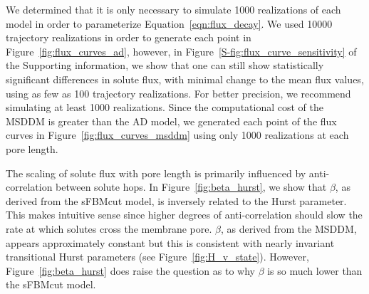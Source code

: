 \documentclass[12pt]{article}
\begin{document}
  

  We determined that it is only necessary to simulate 1000 realizations of each model
  in order to parameterize Equation~\ref{eqn:flux_decay}. We used 10000 trajectory
  realizations in order to generate each point in Figure~\ref{fig:flux_curves_ad}, 
  however, in Figure~\ref{S-fig:flux_curve_sensitivity} of the Supporting information,
  we show that one can still show statistically significant differences in solute 
  flux, with minimal change to the mean flux values, using as few as 100 trajectory
  realizations. 
  For better precision, we recommend simulating at least 1000 realizations. 
  Since the computational cost of the MSDDM is greater than the AD model, we generated
  each point of the flux curves in Figure~\ref{fig:flux_curves_msddm} using only 1000
  realizations at each pore length. 
  
  The scaling of solute flux with pore length is primarily influenced by anti-correlation
  between solute hops. In Figure~\ref{fig:beta_hurst}, we show that $\beta$, as derived 
  from the sFBMcut model, is inversely related to the Hurst parameter. This makes intuitive
  sense since higher degrees of anti-correlation should slow the rate at which solutes
  cross the membrane pore. $\beta$, as derived from the MSDDM, appears approximately 
  constant but this is consistent with nearly invariant transitional Hurst parameters
  (see Figure~\ref{fig:H_v_state}). However, Figure~\ref{fig:beta_hurst} does raise
  the question as to why $\beta$ is so much lower than the sFBMcut model.
  
\end{document}

